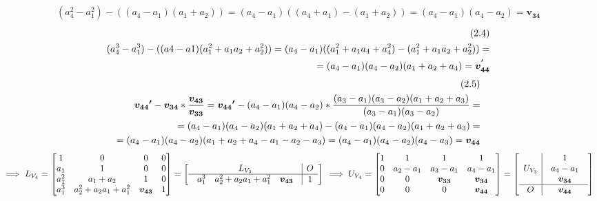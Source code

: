 \documentclass[11pt]{article}
\begin{document}
\begin{align*}\tag{2.3}\label{eq2.3}
\\
(a_4^2-a_1^2)-((a_4-a_1)(a_1+a_2))=(a_4-a_1)((a_4+a_1)-(a_1+a_2))=(a_4-a_1)(a_4-a_2) = \boldsymbol{v_{34}}
\end{align*}
\begin{align*}\tag{2.4}\label{2.4}
\\
(a_4^3-a_1^3)-((a4-a1)(a_1^2+a_1a_2+a_2^2))=(a_4-a_1)((a_1^2+a_1a_4+a_4^2)-(a_1^2+a_1a_2+a_2^2))=\vspace{2mm}\\
=(a_4-a_1)(a_4-a_2)(a_1+a_2+a_4)= \boldsymbol{v_{44}^{'}}
\end{align*}
\begin{align*}\tag{2.5}\label{2.5}
\\
\boldsymbol{v_{44}{'}}-\boldsymbol{v_{34}}*\frac{\displaystyle{\boldsymbol{v_{43}}}}{\displaystyle{\boldsymbol{v_{33}}}}=\boldsymbol{v_{44}{'}}-(a_4-a_1)(a_4-a_2)*\frac{\displaystyle{(a_3-a_1)(a_3-a_2)(a_1+a_2+a_3)}}{\displaystyle{(a_3-a_1)(a_3-a_2)}}=\\
=(a_4-a_1)(a_4-a_2)(a_1+a_2+a_4)-(a_4-a_1)(a_4-a_2)(a_1+a_2+a_3)=\vspace{2mm}\\
=(a_4-a_1)(a_4-a_2)(a_1+a_2+a_4-a_1-a_2-a_3)=(a_4-a_1)(a_4-a_2)(a_4-a_3)=\boldsymbol{v_{44}}
\end{align*}
\vspace{2mm}
\newline
$
\implies
L_{V_4}=
\begin{bmatrix}
1 & 0 & 0 & 0\\
a_1 & 1 & 0 & 0\\
a_1^2 & a_1+a_2 & 1 & 0\\
a_1^3 & a_2^2+a_2a_1+a_1^2 & \boldsymbol{v_{43}} & 1\\
\end{bmatrix}
=
\left[
\begin{array}{c|c}
L_{V_3} & O\\\hline
\begin{array}{ccc}
a_1^3 & a_2^2+a_2a_1+a_1^2 & \boldsymbol{v_{43}}
\end{array} & 1
\end{array}
\right]
\vspace{5mm}
\newline
\implies
U_{V_4}=
\begin{bmatrix}
1 & 1 & 1 & 1\\
0 & a_2-a_1 & a_3-a_1 & a_4 - a_1\\
0 & 0 & \boldsymbol{v_{33}} & \boldsymbol{v_{34}}\\
0 & 0 & 0 & \boldsymbol{v_{44}}
\end{bmatrix}
=
\left[
\begin{array}{c|c}
U_{V_3} & \begin{array}{c}
1\\a_4-a_1\\ \boldsymbol{v_{34}}
\end{array}\\\hline
O & \boldsymbol{v_{44}}
\end{array}
\right]
$
\end{document}
